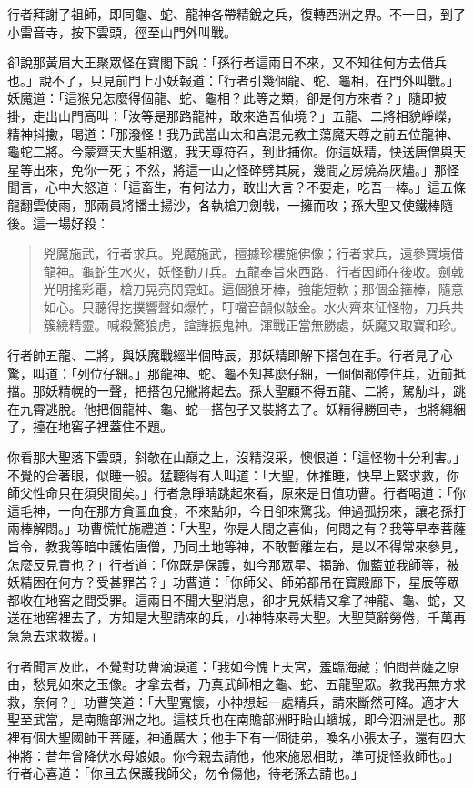 行者拜謝了祖師，即同龜、蛇、龍神各帶精銳之兵，復轉西洲之界。不一日，到了小雷音寺，按下雲頭，徑至山門外叫戰。

卻說那黃眉大王聚眾怪在寶閣下說：「孫行者這兩日不來，又不知往何方去借兵也。」說不了，只見前門上小妖報道：「行者引幾個龍、蛇、龜相，在門外叫戰。」妖魔道：「這猴兒怎麼得個龍、蛇、龜相？此等之類，卻是何方來者？」隨即披掛，走出山門高叫：「汝等是那路龍神，敢來造吾仙境？」五龍、二將相貌崢嶸，精神抖擻，喝道：「那潑怪！我乃武當山太和宮混元教主蕩魔天尊之前五位龍神、龜蛇二將。今蒙齊天大聖相邀，我天尊符召，到此捕你。你這妖精，快送唐僧與天星等出來，免你一死；不然，將這一山之怪碎劈其屍，幾間之房燒為灰燼。」那怪聞言，心中大怒道：「這畜生，有何法力，敢出大言？不要走，吃吾一棒。」這五條龍翻雲使雨，那兩員將播土揚沙，各執槍刀劍戟，一擁而攻；孫大聖又使鐵棒隨後。這一場好殺：
\begin{quote}
兇魔施武，行者求兵。兇魔施武，擅據珍樓施佛像；行者求兵，遠參寶境借龍神。龜蛇生水火，妖怪動刀兵。五龍奉旨來西路，行者因師在後收。劍戟光明搖彩電，槍刀晃亮閃霓虹。這個狼牙棒，強能短軟；那個金箍棒，隨意如心。只聽得扢撲響聲如爆竹，叮噹音韻似敲金。水火齊來征怪物，刀兵共簇繞精靈。喊殺驚狼虎，諠譁振鬼神。渾戰正當無勝處，妖魔又取寶和珍。
\end{quote}

行者帥五龍、二將，與妖魔戰經半個時辰，那妖精即解下搭包在手。行者見了心驚，叫道：「列位仔細。」那龍神、蛇、龜不知甚麼仔細，一個個都停住兵，近前抵擋。那妖精幌的一聲，把搭包兒撇將起去。孫大聖顧不得五龍、二將，駕觔斗，跳在九霄逃脫。他把個龍神、龜、蛇一搭包子又裝將去了。妖精得勝回寺，也將繩綑了，擡在地窖子裡蓋住不題。

你看那大聖落下雲頭，斜欹在山巔之上，沒精沒采，懊恨道：「這怪物十分利害。」不覺的合著眼，似睡一般。猛聽得有人叫道：「大聖，休推睡，快早上緊求救，你師父性命只在須臾間矣。」行者急睜睛跳起來看，原來是日值功曹。行者喝道：「你這毛神，一向在那方貪圖血食，不來點卯，今日卻來驚我。伸過孤拐來，讓老孫打兩棒解悶。」功曹慌忙施禮道：「大聖，你是人間之喜仙，何悶之有？我等早奉菩薩旨令，教我等暗中護佑唐僧，乃同土地等神，不敢暫離左右，是以不得常來參見，怎麼反見責也？」行者道：「你既是保護，如今那眾星、揭諦、伽藍並我師等，被妖精困在何方？受甚罪苦？」功曹道：「你師父、師弟都吊在寶殿廊下，星辰等眾都收在地窖之間受罪。這兩日不聞大聖消息，卻才見妖精又拿了神龍、龜、蛇，又送在地窖裡去了，方知是大聖請來的兵，小神特來尋大聖。大聖莫辭勞倦，千萬再急急去求救援。」

行者聞言及此，不覺對功曹滴淚道：「我如今愧上天宮，羞臨海藏；怕問菩薩之原由，愁見如來之玉像。才拿去者，乃真武師相之龜、蛇、五龍聖眾。教我再無方求救，奈何？」功曹笑道：「大聖寬懷，小神想起一處精兵，請來斷然可降。適才大聖至武當，是南贍部洲之地。這枝兵也在南贍部洲盱眙山蠙城，即今泗洲是也。那裡有個大聖國師王菩薩，神通廣大；他手下有一個徒弟，喚名小張太子，還有四大神將：昔年曾降伏水母娘娘。你今親去請他，他來施恩相助，準可捉怪救師也。」行者心喜道：「你且去保護我師父，勿令傷他，待老孫去請也。」

